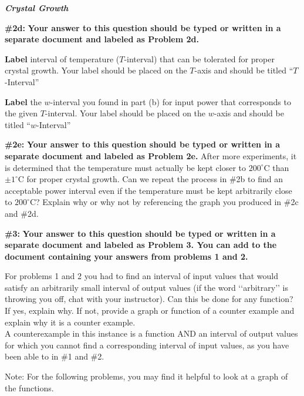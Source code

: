 \documentclass[handout,nooutcomes]{ximera}
\begin{document}
\begin{problem}{\textbf{\textit{Crystal Growth}}}
    \begin{problem}{\textbf{\#2d:}}
    \textbf{Your answer to this question should be typed or written in a separate document and labeled as Problem 2d.}
    
    \textbf{Label} interval of temperature ($T$-interval) that can be tolerated for proper crystal growth. Your label should be placed on the $T$-axis and should be titled ``$T$-Interval''
    
	\textbf{Label} the $w$-interval you found in part (b) for input power that corresponds to the given $T$-interval. Your label should be placed on the $w$-axis and should be titled ``$w$-Interval''
    \end{problem}
    
    \begin{problem}{\textbf{\#2e:}}
    \textbf{Your answer to this question should be typed or written in a separate document and labeled as Problem 2e.}
    After more experiments, it is determined that the temperature must actually be kept closer to $200^\circ$C than $\pm 1^\circ$C for proper crystal growth.  Can we repeat the process in \#2b to find an acceptable power interval even if the temperature must be kept arbitrarily close to $200^\circ$C?  Explain why or why not by referencing the graph you produced in \#2c and \#2d.
    \end{problem}
    
\end{problem}

\begin{problem}{\textbf{\#3:}}
\textbf{Your answer to this question should be typed or written in a separate document and labeled as Problem 3. You can add to the document containing your answers from problems 1 and 2.}

For problems 1 and 2 you had to find an interval of input values that would satisfy an arbitrarily small interval of output values (if the word ‘‘arbitrary’’ is throwing you off, chat with your instructor). Can this be done for any function? If yes, explain why. If not, provide a graph or function of a counter example and explain why it is a counter example. \\ A counterexample in this instance is a function AND an interval of output values for which you cannot find a corresponding interval of input values, as you have been able to in \#1 and \#2.
\end{problem}

Note: For the following problems, you may find it helpful to look at a graph of the functions.
\end{document}
